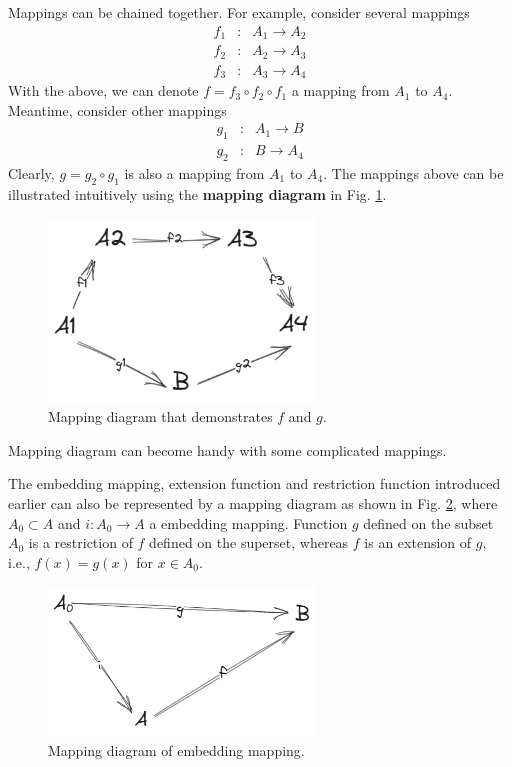 Mappings can be chained together. For example, consider several mappings
\begin{eqnarray}
	f_1 &:& A_1 \rightarrow A_2 \nonumber \\
	f_2 &:& A_2 \rightarrow A_3 \nonumber \\
	f_3 &:& A_3 \rightarrow A_4 \nonumber
\end{eqnarray}
With the above, we can denote $f = f_3\circ f_2\circ f_1$ a mapping from $A_1$ to $A_4$. Meantime, consider other mappings
\begin{eqnarray}
	g_1 &:& A_1 \rightarrow B \nonumber \\
	g_2 &:& B \rightarrow A_4 \nonumber 
\end{eqnarray}
Clearly, $g = g_2\circ g_1$ is also a mapping from $A_1$ to $A_4$. The mappings above can be illustrated intuitively using the \textbf{mapping diagram} in Fig. \ref{fig:mapping_plot}.
\begin{figure}[htbp]
	\centering
	\includegraphics[width=200pt]{chapters/abstract-algebra-basics/figures/mapping_plot.png}
	\caption{Mapping diagram that demonstrates $f$ and $g$.} \label{fig:mapping_plot}
\end{figure}
Mapping diagram can become handy with some complicated mappings.

The embedding mapping, extension function and restriction function introduced earlier can also be represented by a mapping diagram as shown in Fig. \ref{fig:embedding_mapping_plot}, where $A_0 \subset A$ and $i:A_0\rightarrow A$ a embedding mapping. Function $g$ defined on the subset $A_0$ is a restriction of $f$ defined on the superset, whereas $f$ is an extension of $g$, i.e., $f(x) = g(x)$ for $x\in A_0$.
\begin{figure}[htbp]
	\centering
	\includegraphics[width=200pt]{chapters/abstract-algebra-basics/figures/embedding_mapping_plot.png}
	\caption{Mapping diagram of embedding mapping.} \label{fig:embedding_mapping_plot}
\end{figure}

